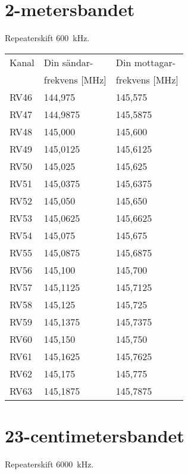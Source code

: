 \section{2-metersbandet}
Repeaterskift 600~kHz.

\begin{tabular}{ l | l | l }
  Kanal & Din sändar- & Din mottagar- \\
        & frekvens [MHz] & frekvens [MHz] \\
  \hline
  RV46 & 144,975 & 145,575\\
  RV47 & 144,9875 & 145,5875\\
  RV48 & 145,000 & 145,600 \\
  RV49 & 145,0125 & 145,6125 \\
  RV50 & 145,025 & 145,625 \\
  RV51 & 145,0375 & 145,6375 \\
  RV52 & 145,050 & 145,650 \\
  RV53 & 145,0625 & 145,6625 \\
  RV54 & 145,075 & 145,675 \\
  RV55 & 145,0875 & 145,6875 \\
  RV56 & 145,100 & 145,700 \\
  RV57 & 145,1125 & 145,7125 \\
  RV58 & 145,125 & 145,725 \\
  RV59 & 145,1375 & 145,7375 \\
  RV60 & 145,150 & 145,750 \\
  RV61 & 145,1625 & 145,7625 \\
  RV62 & 145,175 & 145,775 \\
  RV63 & 145,1875 & 145,7875 \\
\end{tabular}

\section{23-centimetersbandet}
Repeaterskift 6000~kHz.

